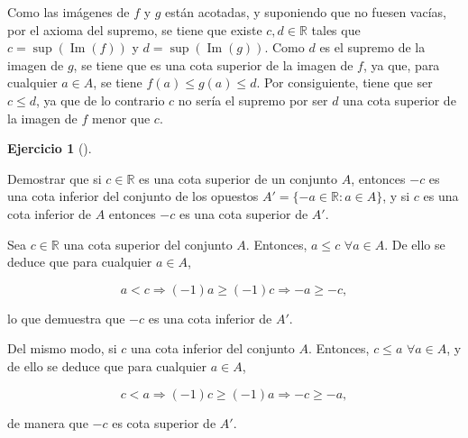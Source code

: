 \documentclass[
  spanish,
  a4paper,
]{scrreport}
\theoremstyle{definition}
\newtheorem{exercise}{Ejercicio}[chapter]
\theoremstyle{remark}
\begin{document}
\begin{tcolorbox}[enhanced jigsaw, arc=.35mm, bottomrule=.15mm, bottomtitle=1mm, breakable, colback=white, colbacktitle=quarto-callout-tip-color!10!white, colframe=quarto-callout-tip-color-frame, coltitle=black, left=2mm, leftrule=.75mm, opacityback=0, opacitybacktitle=0.6, rightrule=.15mm, title=\textcolor{quarto-callout-tip-color}{\faLightbulb}\hspace{0.5em}{Solución}, titlerule=0mm, toprule=.15mm, toptitle=1mm]

Como las imágenes de \(f\) y \(g\) están acotadas, y suponiendo que no
fuesen vacías, por el axioma del supremo, se tiene que existe
\(c,d\in\mathbb{R}\) tales que \(c=\sup(\operatorname{Im}(f))\) y
\(d= \sup(\operatorname{Im}(g))\). Como \(d\) es el supremo de la imagen
de \(g\), se tiene que es una cota superior de la imagen de \(f\), ya
que, para cualquier \(a\in A\), se tiene \(f(a)\leq g(a)\leq d\). Por
consiguiente, tiene que ser \(c\leq d\), ya que de lo contrario \(c\) no
sería el supremo por ser \(d\) una cota superior de la imagen de \(f\)
menor que \(c\).

\end{tcolorbox}

\begin{exercise}[]\protect\hypertarget{exr-cotas-conjunto-opuestos}{}\label{exr-cotas-conjunto-opuestos}

Demostrar que si \(c\in\mathbb{R}\) es una cota superior de un conjunto
\(A\), entonces \(-c\) es una cota inferior del conjunto de los opuestos
\(A'=\{-a\in\mathbb{R}: a\in A\}\), y si \(c\) es una cota inferior de
\(A\) entonces \(-c\) es una cota superior de \(A'\).

\end{exercise}

\begin{tcolorbox}[enhanced jigsaw, arc=.35mm, bottomrule=.15mm, bottomtitle=1mm, breakable, colback=white, colbacktitle=quarto-callout-tip-color!10!white, colframe=quarto-callout-tip-color-frame, coltitle=black, left=2mm, leftrule=.75mm, opacityback=0, opacitybacktitle=0.6, rightrule=.15mm, title=\textcolor{quarto-callout-tip-color}{\faLightbulb}\hspace{0.5em}{Solución}, titlerule=0mm, toprule=.15mm, toptitle=1mm]

Sea \(c\in\mathbb{R}\) una cota superior del conjunto \(A\). Entonces,
\(a\leq c\) \(\forall a\in A\). De ello se deduce que para cualquier
\(a\in A\),

\[
a<c \Rightarrow (-1)a\geq (-1)c \Rightarrow -a\geq -c, 
\]

lo que demuestra que \(-c\) es una cota inferior de \(A'\).

Del mismo modo, si \(c\) una cota inferior del conjunto \(A\). Entonces,
\(c\leq a\) \(\forall a\in A\), y de ello se deduce que para cualquier
\(a\in A\),

\[
c<a \Rightarrow (-1)c\geq (-1)a \Rightarrow -c\geq -a, 
\]

de manera que \(-c\) es cota superior de \(A'\).

\end{tcolorbox}
\end{document}
